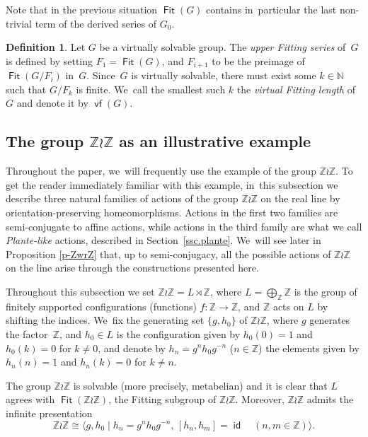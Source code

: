\documentclass[JEP,XML,SOM,Unicode,NoFloatCountersInSection,published]{cedram}
\theoremstyle{definition}
\newtheorem{dfn}[thm]{Definition}
\DeclareMathOperator{\Fit}{\mathsf{Fit}}
\DeclareMathOperator{\id}{\mathsf{id}}
\DeclareMathOperator{\vf}{\mathsf{vf}}
\newcommand{\N}{\mathbb N}
\newcommand{\Z}{\mathbb Z}
\begin{document}
Note that in the previous situation $\Fit(G)$ contains in~particular the last non-trivial term of the derived series of $G_0$.
\begin{dfn}
Let $G$ be a virtually solvable group. The \emph{upper Fitting series} of~$G$ is defined by setting $F_1=\Fit(G)$, and $F_{i+1}$ to be the preimage of $\Fit(G/F_i)$ in~$G$.
Since~$G$ is virtually solvable, there must exist some $k\in \N$ such that $G/F_k$ is finite. We~call the smallest such $k$ the \emph{virtual Fitting length} of $G$ and denote it by $\vf(G)$.
\end{dfn}

\subsection{The group $\Z\wr\Z$ as an illustrative example} \label{sec ejemplo lamp lighter}
Throughout the paper, we~will frequently use the example of the group $\Z \wr \Z$. To get the reader immediately familiar with this example, in~this subsection we describe three natural families of actions of the group $\Z\wr\Z$ on the real line by orientation-preserving homeomorphisms. Actions in the first two families are semi-conjugate to affine actions, while actions in the third family are what we call \emph{Plante-like} actions, described in Section~\ref{ssc.plante}. We~will see later in Proposition \ref{p-ZwrZ} that, up to semi-conjugacy, all the possible actions of $\Z \wr \Z$ on the line arise through the constructions presented here.

Throughout this subsection we set $\Z \wr \Z=L\rtimes \Z$, where $L=\bigoplus_\Z \Z$ is the group of finitely supported configurations (functions) $f\colon \Z\to \Z$, and $\Z$ acts on $L$ by shifting the indices. We~fix the generating set $\{g,h_0\}$ of $\Z\wr\Z$, where $g$ generates the factor~$\Z$, and $h_0\in L$ is the configuration given by $h_0(0)=1$ and $h_0(k)=0$ for $k\neq 0$, and denote by $h_n=g^nh_0g^{-n}$ ($n\in \Z$) the elements given by $h_n(n)=1$ and $h_n(k)=0$ for $k\neq n$.

The group $\Z\wr\Z$ is solvable (more precisely, metabelian) and it is clear that $L$ agrees with $\Fit(\Z\wr\Z)$, the Fitting subgroup of $\Z\wr\Z$. Moreover, $\Z\wr\Z$ admits the infinite presentation
\begin{equation}\Z\wr\Z\cong\langle g, h_0 \mid h_n=g^nh_0g^{-n}, \, [h_n, h_m]= \id \quad (n, m\in \Z)\rangle. \label{e-presentation-ZwrZ}\end{equation}
\end{document}
